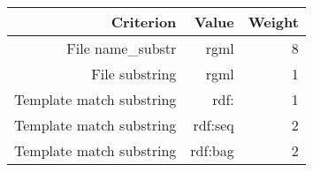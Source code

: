 \begin{tabular}{|r|r|r|}
\hline
\bf Criterion&\bf Value&\bf Weight\\
\hline
File name_substr&rgml&8\\
\hline
File substring&rgml&1\\
\hline
Template match substring&rdf:&1\\
\hline
Template match substring&rdf:seq&2\\
\hline
Template match substring&rdf:bag&2\\
\hline
\end{tabular}
